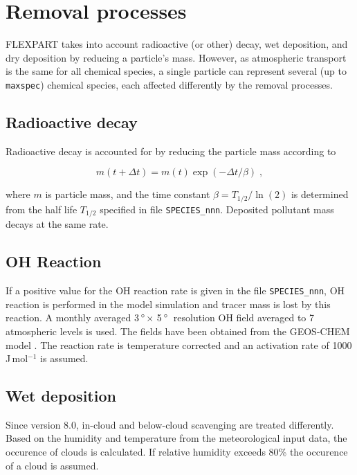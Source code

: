 \documentclass{egu}            %
\newcommand{\degreee}{{$\, \rm ^{\circ}$}}
\newcommand{\degreen}{{$\, \rm ^{\circ}$~}}
\begin{document}
\section{\label{removal}Removal processes}

FLEXPART takes into account radioactive (or other) decay, wet deposition, and
dry deposition by reducing a particle's mass.  However, as atmospheric
transport is the same for all chemical species, a single particle can represent
several (up to \verb|maxspec|) chemical species, each affected differently by
the removal processes.

\subsection{\label{radioactive}Radioactive decay}

Radioactive decay is accounted for by reducing the particle mass according to

\begin{equation}
m(t+\Delta t)=m(t) \exp (-\Delta t /\beta) \;,
\end{equation}

where $m$ is particle mass, and the time constant $\beta=T_{1/2}/\ln(2)$ is
determined from the half life $T_{1/2}$ specified in file \verb|SPECIES_nnn|.
Deposited pollutant mass decays at the same rate.

\subsection{OH Reaction}

If a positive value for the OH reaction rate is given in the file
\verb|SPECIES_nnn|, OH reaction is performed in the model simulation and tracer
mass is lost by this reaction.  A monthly averaged 3\degreee$\times$ 5\degreen resolution OH
field averaged to 7 atmospheric levels is used.  The fields have been obtained
from the GEOS-CHEM model \citep{bey2001}.  The reaction rate is temperature
corrected and an activation rate of 1000 J\,mol$^{-1}$ is assumed.

\subsection{\label{wetdepo}Wet deposition}

Since version 8.0, in-cloud and below-cloud scavenging are treated differently.
Based on the humidity and temperature from the meteorological input data, the
occurence of clouds is calculated.  If relative humidity exceeds 80\% the
occurence of a cloud is assumed.
\end{document}
